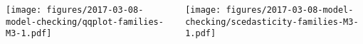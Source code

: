 \documentclass[usenames,dvipsnames]{beamer} %
\begin{document}
\begin{frame}
\begin{columns}[t]
\begin{column}{0.5\textwidth}

\texttt{[image: figures/2017-03-08-model-checking/qqplot-families-M3-1.pdf]}
\end{column}

\begin{column}{0.5\textwidth}

\texttt{[image: figures/2017-03-08-model-checking/scedasticity-families-M3-1.pdf]}
\end{column}
\end{columns}
\end{frame}
\end{document}
